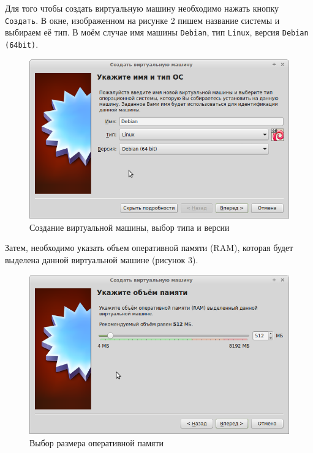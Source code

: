 \documentclass[12pt,a4paper]{article}
\begin{document}
Для того чтобы создать виртуальную машину необходимо нажать кнопку \verb+Создать+. В окне, изображенном на рисунке 2 пишем название системы и выбираем её тип. В моём случае имя машины \verb+Debian+, тип \verb+Linux+, версия \verb+Debian (64bit)+.
\begin{figure}[h!]
\centering
\includegraphics[scale=0.5]{res/CreateMaschine}
\caption{Создание виртуальной машины, выбор типа и версии}
\end{figure}

Затем, необходимо указать объем оперативной памяти (RAM), которая будет выделена данной виртуальной машине (рисунок 3).
\begin{figure}[h!]
\centering
\includegraphics[scale=0.5]{res/RAMSize}
\caption{Выбор размера оперативной памяти}
\end{figure}
\end{document}
